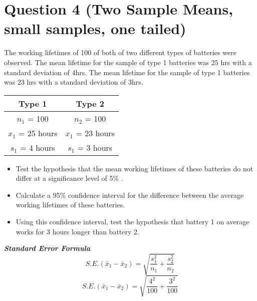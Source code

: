 \documentclass[]{report}
\begin{document}
\section*{Question 4 (Two Sample Means, small samples, one tailed)}
The working lifetimes of 100 of both of two different types of batteries were observed. The mean lifetime for the sample of type 1 batteries was 25 hrs with a standard deviation of 4hrs. The mean lifetime for the sample of type 1 batteries was 23 hrs with a standard deviation of 3hrs. 
\begin{center}
\begin{tabular}{|c||c|}
\hline 
Type 1 & Type 2 \\ \hline \hline
$n_1$ = 100 & $n_2$ = 100 \\ \hline
$x_1$ = 25 hours & $x_1$ = 23 hours \\ \hline
$s_1$ = 4 hours & $s_1$ = 3 hours \\ \hline
\end{tabular} 
\end{center}
\begin{itemize}
\item  Test the hypothesis that the mean working lifetimes of these batteries do not differ at a significance level of 5\% .

\item  Calculate a 95\% confidence interval for the difference between the average working lifetimes of these batteries. 
\item  Using this confidence interval, test the hypothesis that battery 1 on average works for 3 hours longer than battery 2.
\end{itemize}



\textbf{\textit{Standard Error Formula}}
\[ S.E.(\bar{x}_1 - \bar{x}_2)  = \sqrt{\frac{s_1^2}{n_1} + \frac{s_2^2}{n_2}} \]
\[ S.E.(\bar{x}_1 - \bar{x}_2)  = \sqrt{\frac{4^2}{100} + \frac{3^2}{100}}  \]
\newpage
\end{document}
